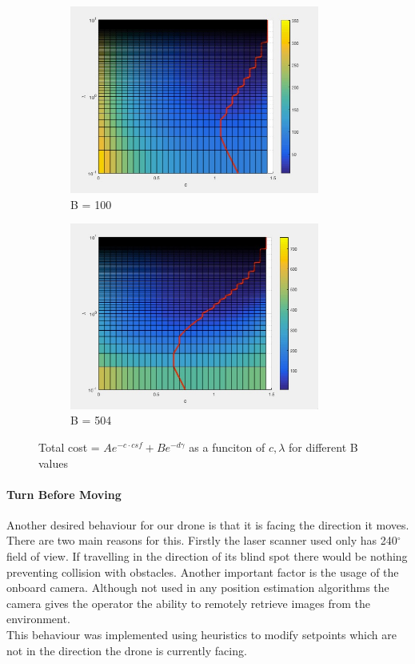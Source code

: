 \documentclass[capstone_report.tex]{subfiles}
\begin{document}
\begin{figure}[H]
    \centering
    \begin{subfigure}{0.5\textwidth}
        \centering
        \includegraphics[width=0.9\textwidth]{imgs/obstacle_vs_goal_B_100.jpg}
        \caption{B = 100}
    \end{subfigure}%
    \begin{subfigure}{0.5\textwidth}
        \centering
        \includegraphics[width=0.9\textwidth]{imgs/obstacle_vs_goal_B_504.jpg}
        \caption{B = 504}
    \end{subfigure}
    \caption{Total cost = $Ae^{-c\cdot csf} + Be^{-d\gamma}$ as a funciton of $c, \lambda$ for different B values}\label{fig:ocf_total_cost}
\end{figure}


\paragraph{Turn Before Moving}
Another desired behaviour for our drone is that it is facing the direction it moves.  There are two main reasons for this.  Firstly the laser scanner used only has 240$^\circ$ field of view.  If travelling in the direction of its blind spot there would be nothing preventing collision with obstacles.  Another important factor is the usage of the onboard camera.  Although not used in any position estimation algorithms the camera gives the operator the ability to remotely retrieve images from the environment.\\

This behaviour was implemented using heuristics to modify setpoints which are not in the direction the drone is currently facing.
\end{document}

